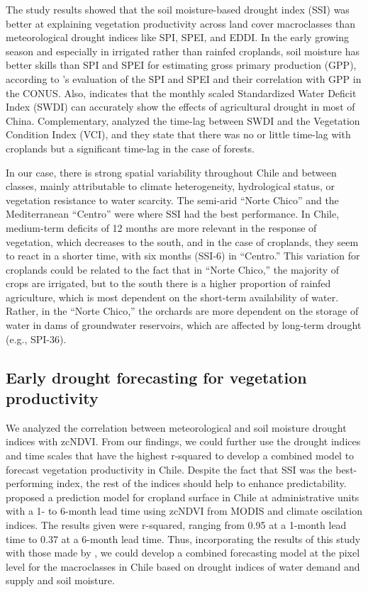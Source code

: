 \documentclass[
  authoryear,
  preprint,
  3p,
  onecolumn]{elsarticle}
\begin{document}
The study results showed that the soil moisture-based drought index
(SSI) was better at explaining vegetation productivity across land cover
macroclasses than meteorological drought indices like SPI, SPEI, and
EDDI. In the early growing season and especially in irrigated rather
than rainfed croplands, soil moisture has better skills than SPI and
SPEI for estimating gross primary production (GPP), according to
\citet{Chatterjee2022}'s evaluation of the SPI and SPEI and their
correlation with GPP in the CONUS. Also, \citet{Zhou2021} indicates that
the monthly scaled Standardized Water Deficit Index (SWDI) can
accurately show the effects of agricultural drought in most of China.
Complementary, \citet{Nicolai2017} analyzed the time-lag between SWDI
and the Vegetation Condition Index (VCI), and they state that there was
no or little time-lag with croplands but a significant time-lag in the
case of forests.

In our case, there is strong spatial variability throughout Chile and
between classes, mainly attributable to climate heterogeneity,
hydrological status, or vegetation resistance to water scarcity. The
semi-arid ``Norte Chico'' and the Mediterranean ``Centro'' were where
SSI had the best performance. In Chile, medium-term deficits of 12
months are more relevant in the response of vegetation, which decreases
to the south, and in the case of croplands, they seem to react in a
shorter time, with six months (SSI-6) in ``Centro.'' This variation for
croplands could be related to the fact that in ``Norte Chico,'' the
majority of crops are irrigated, but to the south there is a higher
proportion of rainfed agriculture, which is most dependent on the
short-term availability of water. Rather, in the ``Norte Chico,'' the
orchards are more dependent on the storage of water in dams of
groundwater reservoirs, which are affected by long-term drought (e.g.,
SPI-36).

\hypertarget{early-drought-forecasting-for-vegetation-productivity}{%
\subsection{Early drought forecasting for vegetation
productivity}\label{early-drought-forecasting-for-vegetation-productivity}}

We analyzed the correlation between meteorological and soil moisture
drought indices with zcNDVI. From our findings, we could further use the
drought indices and time scales that have the highest r-squared to
develop a combined model to forecast vegetation productivity in Chile.
Despite the fact that SSI was the best-performing index, the rest of the
indices should help to enhance predictability. \citet{Zambrano2018}
proposed a prediction model for cropland surface in Chile at
administrative units with a 1- to 6-month lead time using zcNDVI from
MODIS and climate oscilation indices. The results given were r-squared,
ranging from 0.95 at a 1-month lead time to 0.37 at a 6-month lead time.
Thus, incorporating the results of this study with those made by
\citet{Zambrano2018}, we could develop a combined forecasting model at
the pixel level for the macroclasses in Chile based on drought indices
of water demand and supply and soil moisture.
\end{document}

